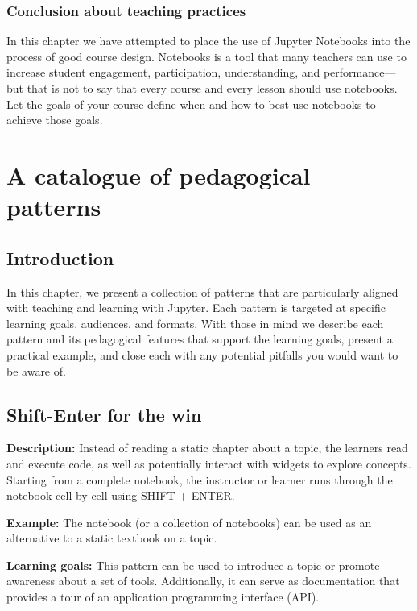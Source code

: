 \documentclass[]{book}
\begin{document}
\subsection{Conclusion about teaching
practices}\label{conclusion-about-teaching-practices}

In this chapter we have attempted to place the use of Jupyter Notebooks
into the process of good course design. Notebooks is a tool that many
teachers can use to increase student engagement, participation,
understanding, and performance---but that is not to say that every
course and every lesson should use notebooks. Let the goals of your
course define when and how to best use notebooks to achieve those goals.

\chapter{A catalogue of pedagogical patterns}\label{catalogue}

\section{Introduction}\label{introduction-1}

In this chapter, we present a collection of patterns that are
particularly aligned with teaching and learning with Jupyter. Each
pattern is targeted at specific learning goals, audiences, and formats.
With those in mind we describe each pattern and its pedagogical features
that support the learning goals, present a practical example, and close
each with any potential pitfalls you would want to be aware of.

\section{Shift-Enter for the win}\label{shift-enter-for-the-win}

\textbf{Description:} Instead of reading a static chapter about a topic,
the learners read and execute code, as well as potentially interact with
widgets to explore concepts. Starting from a complete notebook, the
instructor or learner runs through the notebook cell-by-cell using SHIFT
+ ENTER.

\textbf{Example:} The notebook (or a collection of notebooks) can be
used as an alternative to a static textbook on a topic.

\textbf{Learning goals:} This pattern can be used to introduce a topic
or promote awareness about a set of tools. Additionally, it can serve as
documentation that provides a tour of an application programming
interface (API).
\end{document}
